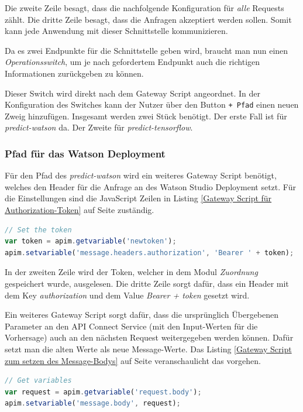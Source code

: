 Die zweite Zeile besagt, dass die nachfolgende Konfiguration für \textit{alle} Requests zählt. Die dritte Zeile besagt,
dass die Anfragen akzeptiert werden sollen. Somit kann jede Anwendung mit dieser Schnittstelle kommunizieren.

Da es zwei Endpunkte für die Schnittstelle geben wird, braucht man nun einen \textit{Operationsswitch}, um je nach
gefordertem Endpunkt auch die richtigen Informationen zurückgeben zu können.

Dieser Switch wird direkt nach dem Gateway Script angeordnet. In der Konfiguration des Switches kann der Nutzer über den
Button \texttt{+ Pfad} einen neuen Zweig hinzufügen. Insgesamt werden zwei Stück benötigt. Der erste Fall ist für
\textit{predict-watson} da. Der Zweite für \textit{predict-tensorflow}.

\subsubsection*{Pfad für das Watson Deployment}
Für den Pfad des \textit{predict-watson} wird ein weiteres Gateway Script benötigt, welches den Header für die Anfrage
an des Watson Studio Deployment setzt. Für die Einstellungen sind die JavaScript Zeilen in Listing
\ref{Gateway Script für Authorization-Token} auf Seite \pageref{Gateway Script für Authorization-Token} zuständig.

\begin{lstlisting}[language=JavaScript, caption=Gateway Script für Authorization-Token, label=Gateway Script für Authorization-Token]
// Set the token
var token = apim.getvariable('newtoken');
apim.setvariable('message.headers.authorization', 'Bearer ' + token);
\end{lstlisting}

In der zweiten Zeile wird der Token, welcher in dem Modul \textit{Zuordnung} gespeichert wurde, ausgelesen. Die dritte
Zeile sorgt dafür, dass ein Header mit dem Key \textit{authorization} und dem Value \textit{Bearer + token} gesetzt wird.

Ein weiteres Gateway Script sorgt dafür, dass die ursprünglich Übergebenen Parameter an den API Connect Service (mit den
Input-Werten für die Vorhersage) auch an den nächsten Request weitergegeben werden können. Dafür setzt man die alten Werte
als neue Message-Werte. Das Listing \ref{Gateway Script zum setzen des Message-Bodys} auf Seite
\pageref{Gateway Script zum setzen des Message-Bodys} veranschaulicht das vorgehen.

\begin{lstlisting}[language=JavaScript, caption=Gateway Script zum setzen des Message-Bodys, label=Gateway Script zum setzen des Message-Bodys]
// Get variables
var request = apim.getvariable('request.body');
apim.setvariable('message.body', request);
\end{lstlisting}

